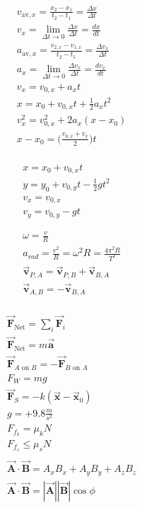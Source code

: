 \documentclass[9pt,letterpaper]{article}
\newcommand{\vect}[1]{\vec{\boldsymbol{#1}}}
\begin{document}
\hspace{0.4in}
\begin{minipage}[t]{0.23\linewidth}
\begin{align*}
&v_{\text{av},x} = \frac{x_{2} - x_{1}}{t_{2}-t_{1}} = \frac{\Delta x}{\Delta t}\\
&v_{x}= \lim_{\Delta t\to 0}\frac{\Delta x}{\Delta t} = \frac{dx}{dt}\\
&a_{\text{av},x} = \frac{v_{2,x} - v_{1,x}}{t_{2}-t_{1}} = \frac{\Delta v_{x}}{\Delta t}\\
&a_{x}= \lim_{\Delta t\to 0}\frac{\Delta v_{x}}{\Delta t} = \frac{dv_{x}}{dt}\\
&v_{x} = v_{0,x}+a_{x}t\\
&x=x_{0}+v_{0,x}t+\frac{1}{2}a_{x}t^{2}\\
&v_{x}^{2}=v_{0,x}^{2}+2a_{x}(x-x_{0})\\
&x-x_{0}=\biggl(\frac{v_{0,x}+v_{x}}{2}\biggr)t\\
\end{align*}
\end{minipage}
\begin{minipage}[t]{0.3\linewidth}
\begin{align*}
&x=x_{0}+v_{0,x}t\\
&y=y_{0}+v_{0,y}t-\frac{1}{2}gt^{2}\\
&v_{x} = v_{0,x}\\
&v_{y} = v_{0,y}-gt\\\\\\
&\omega = \frac{v}{R}\\
&a_{rad}=\frac{v^{2}}{R}=\omega^{2}R=\frac{4\pi^{2}R}{T^{2}}\\
&\vect{v}_{P,A} = \vect{v}_{P,B} + \vect{v}_{B,A}\\
&\vect{v}_{A,B} = - \vect{v}_{B,A}\\
\end{align*}
\end{minipage}
\begin{minipage}[t]{0.3\linewidth}
\begin{align*}
    &\vect{F}_{\text{Net}} = \sum_{i}\vect{F}_{i}\\
    &\vect{F}_{\text{Net}}= m\vect{a}\\
&\vect{F}_{\text{$A$ on $B$}} = -\vect{F}_{\text{$B$ on $A$}}\\
&F_{W} = mg\\
&\vect{F}_{S} = -k(\vect{x}-\vect{x}_{0})\\
&g = +9.8\tfrac{m}{s^{2}}\\
&F_{f_{k}} = \mu_{k}N\\
&F_{f_{s}} \leq \mu_{s}N\\\\
&\vect{A}\cdot\vect{B}=A_x B_x +A_y B_y +A_z B_z\\
&\vect{A}\cdot\vect{B}= |\vect{A}||\vect{B}|\cos{\phi}\\\\
\end{align*}
\end{minipage}
\end{document}
